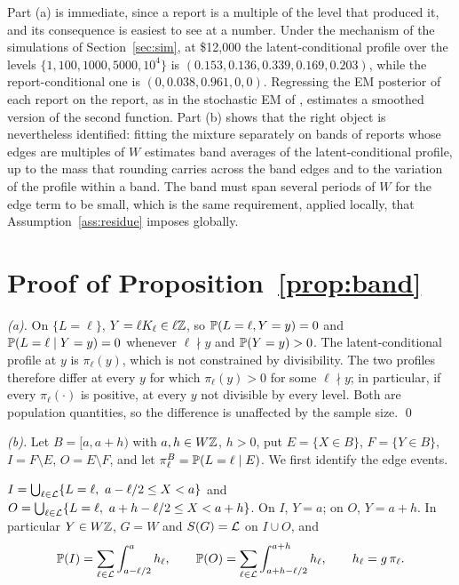 Part (a) is immediate, since a report is a multiple of the level that produced it, and its consequence is easiest to see at a number. Under the mechanism of the simulations of Section~\ref{sec:sim}, at \$12{,}000 the latent-conditional profile over the levels $\{1,\allowbreak 100,\allowbreak 1000,\allowbreak 5000,\allowbreak 10^4\}$ is $(0.153,\allowbreak 0.136,\allowbreak 0.339,\allowbreak 0.169,\allowbreak 0.203)$, while the report-conditional one is $(0,0.038,0.961,0,0)$. Regressing the EM posterior of each report on the report, as in the stochastic EM of \citet{GrossRendtel2016}, estimates a smoothed version of the second function. Part (b) shows that the right object is nevertheless identified: fitting the mixture separately on bands of reports whose edges are multiples of $W$ estimates band averages of the latent-conditional profile, up to the mass that rounding carries across the band edges and to the variation of the profile within a band. The band must span several periods of $W$ for the edge term to be small, which is the same requirement, applied locally, that Assumption~\ref{ass:residue} imposes globally.

\section{Proof of Proposition~\ref{prop:band}}\label{supp:band}

\emph{(a).} On $\{L=\ell\}$, $Y=\ell K_\ell\in\ell\mathbb{Z}$, so $\mathbb{P}(L=\ell,Y=y)=0$ and $\mathbb{P}(L=\ell\mid Y=y)=0$ whenever $\ell\nmid y$ and $\mathbb{P}(Y=y)>0$. The latent-conditional profile at $y$ is $\pi_\ell(y)$, which is not constrained by divisibility. The two profiles therefore differ at every $y$ for which $\pi_\ell(y)>0$ for some $\ell\nmid y$; in particular, if every $\pi_\ell(\cdot)$ is positive, at every $y$ not divisible by every level. Both are population quantities, so the difference is unaffected by the sample size. \qed

\emph{(b).} Let $B=[a,a+h)$ with $a,h\in W\mathbb{Z}$, $h>0$, put $E=\{X\in B\}$, $F=\{Y\in B\}$, $I=F\setminus E$, $O=E\setminus F$, and let $\pi^B_\ell=\mathbb{P}(L=\ell\mid E)$. We first identify the edge events.

\begin{lemma}\label{lem:S-edges}
$I=\bigcup_{\ell\in\mathcal{L}}\{L=\ell,\ a-\ell/2\le X<a\}$ and $O=\bigcup_{\ell\in\mathcal{L}}\{L=\ell,\ a+h-\ell/2\le X<a+h\}$. On $I$, $Y=a$; on $O$, $Y=a+h$. In particular $Y\in W\mathbb{Z}$, $G=W$ and $S(G)=\mathcal{L}$ on $I\cup O$, and
\[
\mathbb{P}(I)=\sum_{\ell\in\mathcal{L}}\int_{a-\ell/2}^{a}h_\ell,\qquad
\mathbb{P}(O)=\sum_{\ell\in\mathcal{L}}\int_{a+h-\ell/2}^{a+h}h_\ell,\qquad h_\ell=g\,\pi_\ell .
\]
\end{lemma}

